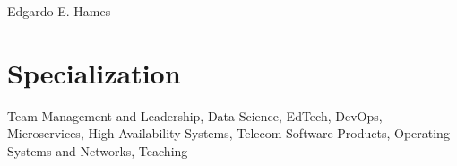 \documentclass[10pt]{article}
\begin{document}
\color{text1} %


{\sffamily\Huge Edgardo E. Hames}


\begin{minipage}[t]{0.5\textwidth} %
\vspace{0pt} %



\section{Specialization}
Team Management and Leadership, Data Science, EdTech, DevOps, Microservices,
High Availability Systems, Telecom Software Products, 
Operating Systems and Networks, Teaching\\[10pt]



\end{minipage}
\end{document}
